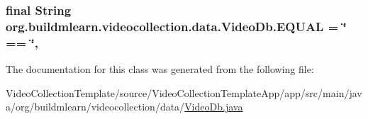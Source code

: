 \subsubsection[{\texorpdfstring{E\+Q\+U\+AL}{EQUAL}}]{\setlength{\rightskip}{0pt plus 5cm}final String org.\+buildmlearn.\+videocollection.\+data.\+Video\+Db.\+E\+Q\+U\+AL = \char`\"{} == \char`\"{}\hspace{0.3cm}{\ttfamily [static]}, {\ttfamily [private]}}\hypertarget{classorg_1_1buildmlearn_1_1videocollection_1_1data_1_1VideoDb_abcf1a1288c4eca09ef95244b8e41ee49}{}\label{classorg_1_1buildmlearn_1_1videocollection_1_1data_1_1VideoDb_abcf1a1288c4eca09ef95244b8e41ee49}


The documentation for this class was generated from the following file\+:\begin{DoxyCompactItemize}
\item 
Video\+Collection\+Template/source/\+Video\+Collection\+Template\+App/app/src/main/java/org/buildmlearn/videocollection/data/\hyperlink{VideoDb_8java}{Video\+Db.\+java}\end{DoxyCompactItemize}
